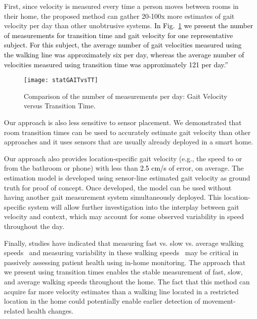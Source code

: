 \documentclass[journal]{IEEEtran}
\newcommand{\RR}[1]{\textcolor{black}{#1}}
\begin{document}
First, since velocity is measured every time a person moves between rooms in their home, the proposed method can gather 20-100x more estimates of gait velocity per day than other unobtrusive systems. \RR{In Fig.~\ref{fig:statGAITvsTT} we present the number of measurements for transition time and gait velocity for one representative subject. For this subject, the average number of gait velocities measured using the walking line was approximately six per day, whereas the average number of velocities measured using transition time was approximately 121 per day.”} 



\begin{figure}
\centering
\texttt{[image: statGAITvsTT]}
\caption{Comparison of the number of measurements per day: Gait Velocity versus Transition Time.}
\label{fig:statGAITvsTT}
\end{figure}


Our approach is also less sensitive to sensor placement. We demonstrated that room transition times can be used to accurately estimate gait velocity than other approaches and it uses sensors that are usually already deployed in a smart home.  

Our approach also provides location-specific gait velocity (e.g., the speed to or from the bathroom or phone) with less than \RR{2.5 cm/s} of error, on average. The estimation model is developed using sensor-line estimated gait velocity as ground truth for proof of concept. Once developed, the model can be used without having another gait measurement system simultaneously deployed. This location-specific system will allow further investigation into the interplay between gait velocity and context, which may account for some observed variability in speed throughout the day. 




 Finally, studies have indicated that measuring fast vs. slow vs. average walking speeds~\cite{Fitzpatrick2007}  and measuring variability in these walking speeds~\cite{Ijmker2012} may be critical in passively assessing patient health using in-home monitoring.  The approach that we present using transition times enables the stable measurement of fast, slow, and average walking speeds throughout the home.   The fact that this method can acquire far more velocity estimates than a walking line located in a restricted location in the home could potentially enable earlier detection of movement-related health changes.
\end{document}
